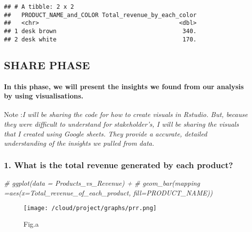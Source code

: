 \documentclass[
]{article}
\newenvironment{Shaded}{\begin{snugshade}}{\end{snugshade}}
\newcommand{\CommentTok}[1]{\textcolor[rgb]{0.56,0.35,0.01}{\textit{#1}}}
\begin{document}
\begin{verbatim}
## # A tibble: 2 x 2
##   PRODUCT_NAME_and_COLOR Total_revenue_by_each_color
##   <chr>                                        <dbl>
## 1 desk brown                                    340.
## 2 desk white                                    170.
\end{verbatim}

\hypertarget{share-phase}{%
\subsection{SHARE PHASE}\label{share-phase}}

\hypertarget{in-this-phase-we-will-present-the-insights-we-found-from-our-analysis-by-using-visualisations.}{%
\paragraph{In this phase, we will present the insights we found from our
analysis by using
visualisations.}\label{in-this-phase-we-will-present-the-insights-we-found-from-our-analysis-by-using-visualisations.}}

Note :\emph{I will be sharing the code for how to create visuals in
Rstudio. But, because they were difficult to understand for
stakeholder's, I will be sharing the visuals that I created using Google
sheets. They provide a accurate, detailed understanding of the insights
we pulled from data.}

\hypertarget{what-is-the-total-revenue-generated-by-each-product-1}{%
\subsubsection{1. What is the total revenue generated by each
product?}\label{what-is-the-total-revenue-generated-by-each-product-1}}

\begin{Shaded}
\begin{Highlighting}[]
\CommentTok{\# ggplot(data = Products\_vs\_Revenue) + }
\CommentTok{\#  geom\_bar(mapping =aes(x=Total\_revenue\_of\_each\_product, fill=PRODUCT\_NAME))}
\end{Highlighting}
\end{Shaded}

\begin{figure}
\centering
\texttt{[image: /cloud/project/graphs/prr.png]}
\caption{Fig.a}
\end{figure}
\end{document}
